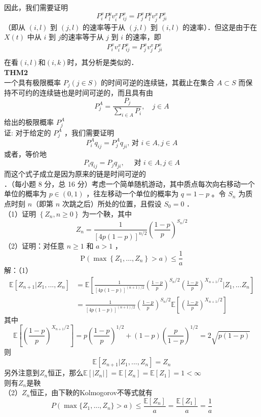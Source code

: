 \documentclass[UTF8,openany]{book}
\begin{document}
因此，我们需要证明
$$
P_i^x P_l^y v_i^x P_{i j}^x=P_j^x P_l^y v_j^x P_{j i}^x
$$
（即从 $(i, l)$ 到 $(j, l)$ 的速率等于从 $(j, l)$ 到 $(i, l)$ 的速率）．但这是由于在 $X(t)$ 中从 $i$ 到 $j$的速率等于从 $j$ 到 $i$ 的速率，即\\
$$
\begin{aligned}
	&P_i^x v_i^x P_{i j}^x=P_j^x v_j^x P_{j i}^x\\
\end{aligned}
$$
在看$(i, l)$和$(i, k)$时，其分析是类似的．\\
\textbf{THM2}\\
一个具有极限概率 $P_j(j \in S)$ 的时间可逆的连续链，其截止在集合 $A \subset S$ 而保持不可约的连续链也是时间可逆的，而且具有由\\
$$
P_j^A=\frac{P_j}{\sum_{i \in A} P_i}, \quad j \in A
$$
给出的极限概率 $P_j^A$ \\
证: 对于给定的 $P_j^A$ ，我们需要证明
$$
P_i^A q_{i j}=P_j^A q_{j i} \text {, 对 } i \in A, j \in A
$$
或者，等价地
$$
P_i q_{i j}=P_j q_{j i}, \quad \text { 对 } i \in A, j \in A
$$
而这个式子成立是因为原来的链是时间可逆的\\


．（每小题 8 分，总 16 分）考虑一个简单随机游动，其中质点每次向右移动一个单位的概率为 $p \in(0,1)$ ，往左移动一个单位的概率为 $q=1-p$ 。令 $S_{n}$ 为质点时刻 $n$（即第 $n$ 次跳之后）所处的位置，且假设 $S_{0}=0$ ．\\
（1）证明 $\left\{Z_{n}, n \geq 0\right\}$ 为一个鞅，其中
$$
Z_{n}=\frac{1}{[4 p(1-p)]^{n / 2}}\left(\frac{1-p}{p}\right)^{S_{n} / 2}
$$
（2）证明：对任意 $n \geq 1$ 和 $a>1$ ，
$$
\mathrm{P}\left(\max \left\{Z_{1}, \ldots, Z_{n}\right\}>a\right) \leq \frac{1}{a}
$$
解：（1）\\
$$
\begin{aligned}
	\mathbb{E}[Z_{n+1}|Z_1,...,Z_n] &= \mathbb{E}\left[\frac{1}{[4 p(1-p)]^{(n+1) / 2}}\left(\frac{1-p}{p}\right)^{S_{n} / 2}\left(\frac{1-p}{p}\right)^{X_{n+1} / 2}|Z_1,...Z_n\right] \\
	& =\frac{1}{[4 p(1-p)]^{(n+1) / 2}}\left(\frac{1-p}{p}\right)^{S_{n} / 2}\mathbb{E}\left[\left(\frac{1-p}{p}\right)^{X_{n+1} / 2}\right ]
\end{aligned}
$$
其中
\[
\mathbb{E}\left[\left(\frac{1-p}{p}\right)^{X_{n+1} / 2}\right ]=p\left(\frac{1-p}{p}\right)^{1 / 2}+(1-p)\left(\frac{p}{1-p}\right)^{1 / 2}=2\sqrt{p(1-p)}
\]
则
\[
\mathbb{E}[Z_{n+1}|Z_1,...,Z_n]=Z_n
\]
另外注意到$Z_n$恒正，那么$\mathbb{E}[|Z_n|]=\mathbb{E}[Z_n]=\mathbb{E}[Z_1]=1<\infty$\\
则有$Z_n$是鞅\\
（2）$Z_n$恒正，由下鞅的Kolmogorov不等式就有\\
\[
P(\max\{Z_1,...,Z_n\}>a) \le \frac{\mathbb{E}[Z_n]}{a}=\frac{\mathbb{E}[Z_1]}{a}=\frac{1}{a}
\]\\
\end{document}
